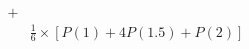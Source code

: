 \documentclass[preview]{standalone}
\begin{document}
\begin{align*}
+&\\&\frac{1}{6}\times[P(1)+4P(1.5)+P(2)]
\end{align*}
\end{document}
